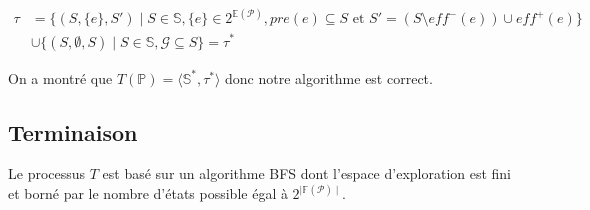 \begin{equation*}
    \begin{aligned}
    \tau &= \{(S, \{e\}, S') \mid S \in \mathbb{S}, \{e\} \in 2^{\mathds{E}(\mathcal{P})}, pre(e) \subseteq S \text{ et } S' = (S \setminus eff^-(e)) \cup eff^+(e)\} \\
    &\cup \{(S, \emptyset, S) \mid S \in \mathds{S}, \mathcal{G} \subseteq S\} = \tau^*
    \end{aligned}
\end{equation*}

On a montré que $T(\mathds{P}) = \langle \mathds{S}^*, \tau^*\rangle$ donc notre algorithme est correct.
\subsection{Terminaison}
Le processus $T$ est basé sur un algorithme BFS dont l'espace d'exploration est fini et borné par le nombre d'états possible égal à $2^{\mid \mathds{F}(\mathcal{P}) \mid}$.